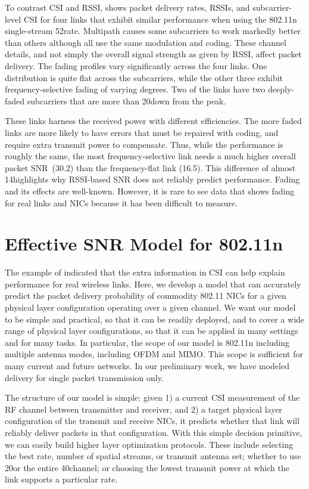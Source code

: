 To contrast CSI and RSSI,  shows packet delivery rates, RSSIs, and subcarrier-level CSI for four links that exhibit similar performance when using the 802.11n single-stream 52\Mbps rate. Multipath causes some subcarriers to work markedly better than others although all use the same modulation and coding. These channel details, and not simply the overall signal strength as given by RSSI, affect packet delivery. The fading profiles vary significantly across the four links. One distribution is quite flat across the subcarriers, while the other three exhibit frequency-selective fading of varying degrees. Two of the links have two deeply-faded subcarriers that are more than 20\dB down from the peak.

These links harness the received power with different efficiencies.
The more faded links are more likely to have errors that must be repaired with coding, and require extra transmit power to compensate. Thus, while the performance is roughly the same, the most frequency-selective link needs a much higher overall packet SNR~(30.2\dB) than the frequency-flat link (16.5\dB). This difference of almost 14\dB highlights why RSSI-based SNR does not reliably predict performance. Fading and its effects are well-known. However, it is rare to see data that shows fading for real links and NICs because it has been difficult to measure.

\section{Effective SNR Model for 802.11n}
The example of  indicated that the extra information in CSI can help explain performance for real wireless links. Here, we develop a model that can accurately predict the packet delivery probability of commodity 802.11 NICs for a given physical layer configuration operating over a given channel. We want our model to be simple and practical, so that it can be readily deployed, and to cover a wide range of physical layer configurations, so that it can be applied in many settings and for many tasks. In particular, the scope of our model is 802.11n including multiple antenna modes, including OFDM and MIMO\@. This scope is sufficient for many current and future networks. In our preliminary work, we have modeled delivery for single packet transmission only.

The structure of our model is simple: given 1) a current CSI measurement of the RF channel between transmitter and receiver, and 2) a target physical layer configuration of the transmit and receive NICs, it predicts whether that link will reliably deliver packets in that configuration.
With this simple decision primitive, we can easily build higher layer optimization protocols. These include selecting the best rate, number of spatial streams, or transmit antenna set; whether to use 20\MHz or the entire 40\MHz channel; or choosing the lowest transmit power at which the link supports a particular rate.

